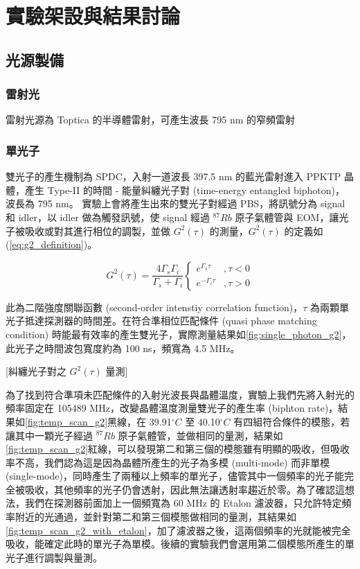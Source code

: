\documentclass[class=NCU_thesis, crop=false]{standalone}
\begin{document}
\chapter{實驗架設與結果討論}


\section{光源製備}

\subsection{雷射光}
雷射光源為 Toptica 的半導體雷射，可產生波長 795 nm 的窄頻雷射

\subsection{單光子}
\label{subsection:single_photon}
雙光子的產生機制為 SPDC，入射一道波長 397.5 nm 的藍光雷射進入 PPKTP 晶體，產生 Type-II 的時間 - 能量糾纏光子對 (time-energy entangled biphoton)，波長為 795 nm。
實驗上會將產生出來的雙光子對經過 PBS，將訊號分為 signal 和 idler，以 idler 做為觸發訊號，使 signal 經過 $^{87}Rb$ 原子氣體管與 EOM，讓光子被吸收或對其進行相位的調製，並做 $G^{2}(\tau)$ 的測量，$G^{2}(\tau)$ 的定義如 (\ref{eq:g2_definition})。

\begin{equation}
    G^{2}(\tau)=\frac{4\Gamma_{s}\Gamma_{i}}{\Gamma_{s}+\Gamma_{i}}\left\{\begin{matrix}
        e^{\Gamma_{s}\tau} & ,\tau<0\\
        e^{-\Gamma_{i}\tau} & ,\tau>0
        \end{matrix}\right.
\label{eq:g2_definition}
\end{equation}

此為二階強度關聯函數 (second-order intenstiy correlation function)，$\tau$ 為兩顆單光子抵達探測器的時間差。在符合準相位匹配條件 (quasi phase matching condition) 時能最有效率的產生雙光子，實際測量結果如\cref{fig:single_photon_g2}，此光子之時間波包寬度約為 100 ns，頻寬為 4.5 MHz。

[糾纏光子對之 $G^{2}(\tau)$ 量測]

為了找到符合準項未匹配條件的入射光波長與晶體溫度，實驗上我們先將入射光的頻率固定在 105489 MHz，改變晶體溫度測量雙光子的產生率 (biphton rate)，結果如\cref{fig:temp_scan_g2}黑線，在 39.91$^{\circ}C$ 至 40.10$^{\circ}C$ 有四組符合條件的模態，若讓其中一顆光子經過 $^{87}Rb$ 原子氣體管，並做相同的量測，結果如\cref{fig:temp_scan_g2}紅線，可以發現第二和第三個的模態雖有明顯的吸收，但吸收率不高，我們認為這是因為晶體所產生的光子為多模 (multi-mode) 而非單模 (single-mode)，同時產生了兩種以上頻率的單光子，儘管其中一個頻率的光子能完全被吸收，其他頻率的光子仍會透射，因此無法讓透射率趨近於零。為了確認這想法，我們在探測器前面加上一個頻寬為 60 MHz 的 Etalon 濾波器，只允許特定頻率附近的光通過，並針對第二和第三個模態做相同的量測，其結果如\cref{fig:temp_scan_g2_with_etalon}，加了濾波器之後，這兩個頻率的光就能被完全吸收，能確定此時的單光子為單模。後續的實驗我們會選用第二個模態所產生的單光子進行調製與量測。
\end{document}
